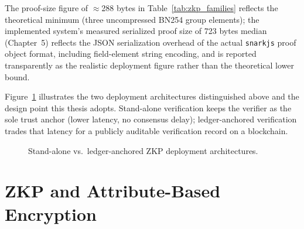 \documentclass[12pt,a4paper,oneside]{report}
\begin{document}
The proof-size figure of $\approx$288 bytes in Table~\ref{tab:zkp_families}
reflects the theoretical minimum (three uncompressed BN254 group elements);
the implemented system's measured serialized proof size of 723 bytes
median (Chapter~5) reflects the JSON serialization overhead of the actual
\texttt{snarkjs} proof object format, including field-element string
encoding, and is reported transparently as the realistic deployment figure
rather than the theoretical lower bound.

Figure~\ref{fig:zkp_taxonomy} illustrates the two deployment
architectures distinguished above and the design point this thesis
adopts. Stand-alone verification keeps the verifier as the sole trust
anchor (lower latency, no consensus delay); ledger-anchored verification
trades that latency for a publicly auditable verification record on a
blockchain.

\begin{figure}[htbp]
\centering
{}
\caption{Stand-alone vs.\ ledger-anchored ZKP deployment architectures.}
\label{fig:zkp_taxonomy}
\end{figure}

\section{ZKP and Attribute-Based Encryption}
\end{document}
